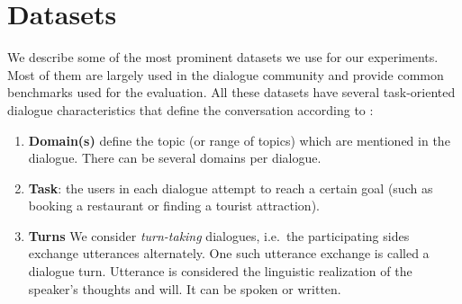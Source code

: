 \section{Datasets}
\label{02:sec:input-data-desc}
We describe some of the most prominent datasets we use for our experiments.
Most of them are largely used in the dialogue community and provide common benchmarks used for the evaluation.
All these datasets have several task-oriented dialogue characteristics that define the conversation according to \cite{young_pomdp-based_2013}:
\begin{enumerate}
\item \textbf{Domain(s)} define the topic (or range of topics) which are mentioned in the dialogue. There can be several domains per dialogue.
\item \textbf{Task}: the users in each dialogue attempt to reach a certain goal (such as booking a restaurant or finding a tourist attraction).
\item \textbf{Turns} We consider \emph{turn-taking} dialogues, i.e.\ the participating sides exchange utterances alternately.
One such utterance exchange is called a dialogue turn.
Utterance is considered the linguistic realization of the speaker's thoughts and will. It can be spoken or written. 


\end{enumerate}
